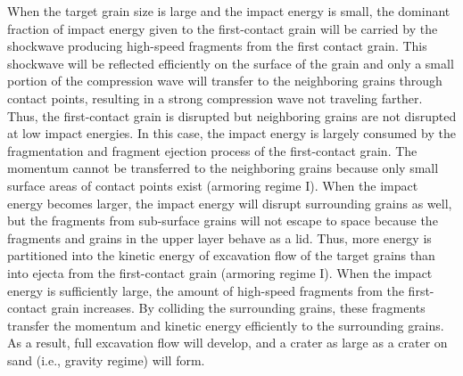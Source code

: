 \documentclass[3p,authoryear]{elsarticle}
\begin{document}
When the target grain size is large and the impact energy is small, the dominant fraction of impact energy given to the first-contact grain will be carried by the shockwave producing high-speed fragments from the first contact grain. This shockwave will be reflected efficiently on the surface of the grain and only a small portion of the compression wave will transfer to the neighboring grains through contact points, resulting in a strong compression wave not traveling farther. Thus, the first-contact grain is disrupted but neighboring grains are not disrupted at low impact energies. In this case, the impact energy is largely consumed by the fragmentation and fragment ejection process of the first-contact grain. The momentum cannot be transferred to the neighboring grains because only small surface areas of contact points exist (armoring regime I). When the impact energy becomes larger, the impact energy will disrupt surrounding grains as well, but the fragments from sub-surface grains will not escape to space because the fragments and grains in the upper layer behave as a lid. Thus, more energy is partitioned into the kinetic energy of excavation flow of the target grains than into ejecta from the first-contact grain (armoring regime I). When the impact energy is sufficiently large, the amount of high-speed fragments from the first-contact grain increases. By colliding the surrounding grains, these fragments transfer the momentum and kinetic energy efficiently to the surrounding grains. As a result, full excavation flow will develop, and a crater as large as a crater on sand (i.e., gravity regime) will form.
\end{document}
